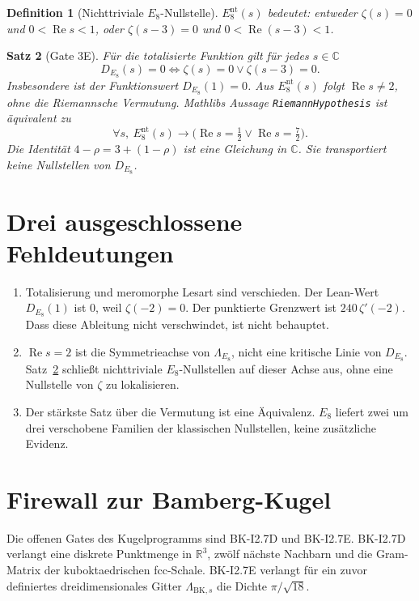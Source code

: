 \documentclass[11pt,a4paper]{article}
\newtheorem{theorem}{Satz}[section]
\newtheorem{definition}[theorem]{Definition}
\begin{document}
\begin{definition}[Nichttriviale $E_8$-Nullstelle]
  $E_8^{\mathrm{nt}}(s)$ bedeutet: entweder
  $\zeta(s)=0$ und $0<\operatorname{Re}s<1$, oder
  $\zeta(s-3)=0$ und $0<\operatorname{Re}(s-3)<1$.
\end{definition}

\begin{theorem}[Gate 3E]
  \label{thm:3e}
  F\"ur die totalisierte Funktion gilt f\"ur jedes $s\in\mathbb{C}$
  \[
    D_{E_8}(s)=0
    \iff
    \zeta(s)=0 \lor \zeta(s-3)=0.
  \]
  Insbesondere ist der Funktionswert $D_{E_8}(1)=0$.
  Aus $E_8^{\mathrm{nt}}(s)$ folgt $\operatorname{Re}s\neq 2$, ohne
  die Riemannsche Vermutung.
  Mathlibs Aussage \texttt{RiemannHypothesis} ist \"aquivalent zu
  \[
    \forall s,\ 
    E_8^{\mathrm{nt}}(s)
    \rightarrow
    \bigl(\operatorname{Re}s=\tfrac12 \lor \operatorname{Re}s=\tfrac72\bigr).
  \]
  Die Identit\"at $4-\rho=3+(1-\rho)$ ist eine Gleichung in
  $\mathbb{C}$. Sie transportiert keine Nullstellen von $D_{E_8}$.
\end{theorem}

\section{Drei ausgeschlossene Fehldeutungen}

\begin{enumerate}
  \item Totalisierung und meromorphe Lesart sind verschieden.
  Der Lean-Wert $D_{E_8}(1)$ ist $0$, weil $\zeta(-2)=0$.
  Der punktierte Grenzwert ist $240\,\zeta'(-2)$.
  Dass diese Ableitung nicht verschwindet, ist nicht behauptet.
  \item $\operatorname{Re}s=2$ ist die Symmetrieachse von
  $\Lambda_{E_8}$, nicht eine kritische Linie von $D_{E_8}$.
  Satz~\ref{thm:3e} schlie\ss t nichttriviale $E_8$-Nullstellen auf
  dieser Achse aus, ohne eine Nullstelle von $\zeta$ zu lokalisieren.
  \item Der st\"arkste Satz \"uber die Vermutung ist eine
  \"Aquivalenz. $E_8$ liefert zwei um drei verschobene Familien der
  klassischen Nullstellen, keine zus\"atzliche Evidenz.
\end{enumerate}

\section{Firewall zur Bamberg-Kugel}

Die offenen Gates des Kugelprogramms sind BK-I2.7D und BK-I2.7E.
BK-I2.7D verlangt eine diskrete Punktmenge in $\mathbb{R}^3$, zw\"olf
n\"achste Nachbarn und die Gram-Matrix der kuboktaedrischen
fcc-Schale. BK-I2.7E verlangt f\"ur ein zuvor definiertes
dreidimensionales Gitter $\Lambda_{\mathrm{BK},s}$ die Dichte
$\pi/\sqrt{18}$.
\end{document}
